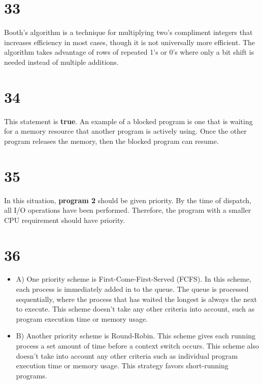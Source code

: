 \documentclass[a4paper,11pt]{article}
\begin{document}

\section*{33}
Booth's algorithm is a technique for multiplying two's compliment integers that increases efficiency in most cases, though it is not universally more efficient.  The algorithm takes advantage of rows of repeated 1's or 0's where only a bit shift is needed instead of multiple additions.  


\section*{34}
This statement is {\bf true}.  An example of a blocked program is one that is waiting for a memory resource that another program is actively using.  Once the other program releases the memory, then the blocked program can resume.


\section*{35}
In this situation, {\bf program 2} should be given priority.  By the time of dispatch, all I/O operations have been performed.  Therefore, the program with a smaller CPU requirement should have priority.  


\section*{36}
\begin{itemize}
  \item A) One priority scheme is First-Come-First-Served (FCFS).  In this scheme, each process is immediately added in to the queue.  The queue is processed sequentially, where the process that has waited the longest is always the next to execute.  This scheme doesn't take any other criteria into account, such as program execution time or memory usage.
  \item B) Another priority scheme is Round-Robin.  This scheme gives each running process a set amount of time before a context switch occurs.  This scheme also doesn't take into account any other criteria such as individual program execution time or memory usage.  This strategy favors short-running programs.
\end{itemize}
\end{document}
